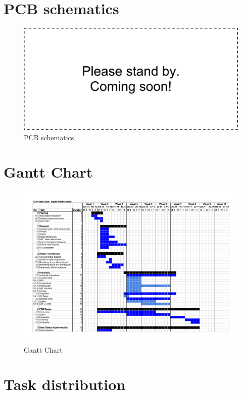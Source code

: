 \clearpage

\section{PCB schematics}
\label{sec:pcb_schematics}
\begin{figure}[htb]
\includegraphics[width=\columnwidth]{Images/dummy}
\caption{PCB schematics}
\label{fig:pcb_schematics}
\end{figure}


\section{Gantt Chart}
\label{sec:gantt_chart}
\begin{figure}[htb]
\centering
\includegraphics[angle=90, width=0.9\columnwidth]{Data/gantt_chart}
\caption{Gantt Chart}
\label{fig:gantt_chart}
\end{figure}

\clearpage

\section{Task distribution}
\label{sec:task_distribution}
\TODO{}


